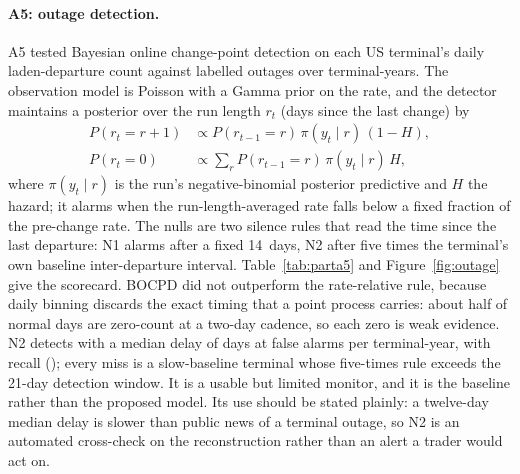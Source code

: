 \paragraph{A5: outage detection.} A5 tested Bayesian online change-point detection
\citep{adams2007} on each US terminal's daily laden-departure count against
\aFiveOutages{} labelled outages over \aFiveTerminalYears{} terminal-years. The
observation model is Poisson with a Gamma prior on the rate, and the detector
maintains a posterior over the run length $r_t$ (days since the last change) by
\begin{equation}
\begin{aligned}
  P(r_t = r+1) &\propto P(r_{t-1} = r)\, \pi(y_t \mid r)\,(1-H), \\
  P(r_t = 0)   &\propto \textstyle\sum_r P(r_{t-1} = r)\, \pi(y_t \mid r)\, H,
\end{aligned}
\label{eq:bocpd}
\end{equation}
where $\pi(y_t \mid r)$ is the run's negative-binomial posterior predictive and
$H$ the hazard; it alarms when the run-length-averaged rate falls below a fixed
fraction of the pre-change rate. The nulls are two silence rules that read the
time since the last departure: N1 alarms after a fixed 14~days, N2 after five times
the terminal's own baseline inter-departure interval. Table~\ref{tab:parta5} and
Figure~\ref{fig:outage} give the scorecard. BOCPD did not outperform the
rate-relative rule, because daily binning discards the exact timing that a point
process carries: about half of normal days are zero-count at a two-day cadence, so
each zero is weak evidence. N2 detects with a median delay of \aFiveNTwoDelay{}
days at \aFiveNTwoFar{} false alarms per terminal-year, with recall
\aFiveNTwoRecall{} (\aFiveNTwoHits); every miss is a slow-baseline terminal whose
five-times rule exceeds the 21-day detection window. It is a usable but limited
monitor, and it is the baseline rather than the proposed model. Its use should be
stated plainly: a twelve-day median delay is slower than public news of a terminal
outage, so N2 is an automated cross-check on the reconstruction rather than an
alert a trader would act on.

\begin{table}[tb]
\centering\small
\caption{Outage detection against labelled terminal outages. N2 is the pre-registered
null and the usable artefact; its recall is the relevant number.}
\label{tab:parta5}

\end{table}

